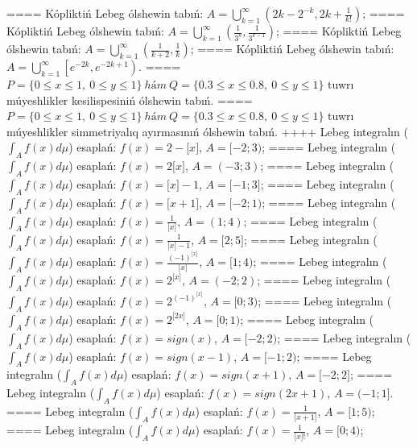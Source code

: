 ====
Kópliktiń Lebeg ólshewin tabıń: \(A = \bigcup_{k = 1}^{\infty}\left( 2k - 2^{- k},2k + \frac{1}{k!} \right)\);
====
Kópliktiń Lebeg ólshewin tabıń: \(A = \bigcup_{k = 1}^{\infty}\left( \frac{1}{3^{k}},\frac{1}{3^{k - 1}} \right)\);
====
Kópliktiń Lebeg ólshewin tabıń: \(A = \bigcup_{k = 1}^{\infty}\left( \frac{1}{k + 2},\frac{1}{k} \right)\);
====
Kópliktiń Lebeg ólshewin tabıń: \(A = \bigcup_{k = 1}^{\infty}\left\lbrack e^{- 2k},e^{- 2k + 1} \right)\).
====
\(P = \{ 0 \leq x \leq 1,\ 0 \leq y \leq 1\}\ hám\ Q = \{ 0.3 \leq x \leq 0.8,\ 0 \leq y \leq 1\}\) tuwrı múyeshlikler kesilispesiniń ólshewin tabıń.
====
\(P = \{ 0 \leq x \leq 1,\ 0 \leq y \leq 1\}\ hám\ Q = \{ 0.3 \leq x \leq 0.8,\ 0 \leq y \leq 1\}\) tuwrı múyeshlikler simmetriyalıq ayırmasınıń ólshewin tabıń.
++++
Lebeg integralın (\(\int_{A}^{}{f(x)d\mu}\)) esaplań: \(f(x) = 2 - \lbrack x\rbrack\), \(A = \lbrack - 2;3)\);
====
Lebeg integralın (\(\int_{A}^{}{f(x)d\mu}\)) esaplań: \(f(x) = 2\lbrack x\rbrack\), \(A = ( - 3;3)\);
====
Lebeg integralın (\(\int_{A}^{}{f(x)d\mu}\)) esaplań: \(f(x) = \lbrack x\rbrack - 1\), \(A = \lbrack - 1;3\rbrack\);
====
Lebeg integralın (\(\int_{A}^{}{f(x)d\mu}\)) esaplań: \(f(x) = \lbrack x + 1\rbrack\), \(A = \lbrack - 2;1)\);
====
Lebeg integralın (\(\int_{A}^{}{f(x)d\mu}\)) esaplań: \(f(x) = \frac{1}{\lbrack x\rbrack}\), \(A = (1;4)\);
====
Lebeg integralın (\(\int_{A}^{}{f(x)d\mu}\)) esaplań: \(f(x) = \frac{1}{\lbrack x\rbrack - 1}\), \(A = \lbrack 2;5\rbrack\);
====
Lebeg integralın (\(\int_{A}^{}{f(x)d\mu}\)) esaplań: \(f(x) = \frac{( - 1)^{\lbrack x\rbrack}}{\lbrack x\rbrack}\), \(A = \lbrack 1;4)\);
====
Lebeg integralın (\(\int_{A}^{}{f(x)d\mu}\)) esaplań: \(f(x) = 2^{\lbrack x\rbrack}\), \(A = ( - 2;2)\);
====
Lebeg integralın (\(\int_{A}^{}{f(x)d\mu}\)) esaplań: \(f(x) = 2^{( - 1)^{\lbrack x\rbrack}}\), \(A = \lbrack 0;3)\);
====
Lebeg integralın (\(\int_{A}^{}{f(x)d\mu}\)) esaplań: \(f(x) = 2^{\lbrack 2x\rbrack}\), \(A = \lbrack 0;1)\);
====
Lebeg integralın (\(\int_{A}^{}{f(x)d\mu}\)) esaplań: \(f(x) = sign(x)\), \(A = \lbrack - 2;2)\);
====
Lebeg integralın (\(\int_{A}^{}{f(x)d\mu}\)) esaplań: \(f(x) = sign(x - 1)\), \(A = \lbrack - 1;2)\);
====
Lebeg integralın (\(\int_{A}^{}{f(x)d\mu}\)) esaplań: \(f(x) = sign(x + 1)\), \(A = \lbrack - 2;2\rbrack\);
====
Lebeg integralın (\(\int_{A}^{}{f(x)d\mu}\)) esaplań: \(f(x) = sign(2x + 1)\), \(A = ( - 1;1\rbrack\).
====
Lebeg integralın (\(\int_{A}^{}{f(x)d\mu}\)) esaplań: \(f(x) = \frac{1}{\lbrack x + 1\rbrack}\), \(A = \lbrack 1;5)\);
====
Lebeg integralın (\(\int_{A}^{}{f(x)d\mu}\)) esaplań: \(f(x) = \frac{1}{\lbrack x\rbrack!}\), \(A = \lbrack 0;4)\);
